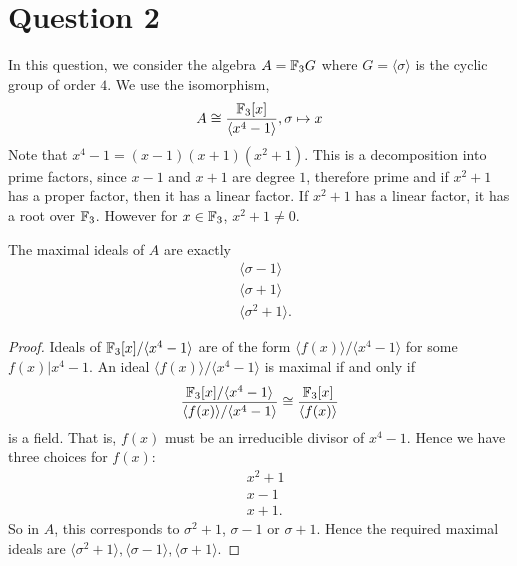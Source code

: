 \documentclass{unswmaths}
\begin{document}
\section*{Question 2}
In this question, we consider the algebra $A = {\mathbb{F}_3} G$ where $G = \langle \sigma\rangle$
is the cyclic group of order $4$. We use the isomorphism,
\begin{equation*}
    A\cong \frac{{\mathbb{F}_3}[x]}{\langle x^4-1\rangle}, \sigma\mapsto x
\end{equation*}
Note that $x^4-1 = (x-1)(x+1)(x^2+1)$. This is a decomposition into prime factors,
since $x-1$ and $x+1$ are degree $1$, therefore prime and if $x^2+1$ has a proper factor,
then it has a linear factor. If $x^2+1$ has a linear factor, it has a root over ${\mathbb{F}_3}$. However
for $x \in {\mathbb{F}_3}$, $x^2+1\neq 0$.

\begin{lemma}
    The maximal ideals of $A$ are exactly
    \begin{align*}
        &\langle \sigma-1\rangle\\
        &\langle \sigma+1\rangle\\
        &\langle \sigma^2+1\rangle.
    \end{align*}
\end{lemma}
\begin{proof}
    Ideals of ${\mathbb{F}_3}[x]/\langle x^4-1\rangle$ are of the form $\langle f(x)\rangle/\langle x^4-1\rangle$
    for some $f(x)|x^4-1$. An ideal $\langle f(x) \rangle/\langle x^4-1\rangle$ is maximal
    if and only if
    \begin{equation*}
        \frac{{\mathbb{F}_3}[x]/\langle x^4-1\rangle}{\langle f(x)\rangle/\langle x^4-1\rangle} \cong \frac{{\mathbb{F}_3}[x]}{\langle f(x)\rangle}
    \end{equation*}
    is a field. That is, $f(x)$ must be an irreducible divisor of $x^4-1$. Hence we
    have three choices for $f(x)$:
    \begin{align*}
        &x^2+1\\
        &x-1\\
        &x+1.
    \end{align*}
    So in $A$, this corresponds to $\sigma^2+1$, $\sigma-1$ or $\sigma+1$. Hence the required
    maximal ideals are $\langle \sigma^2+1\rangle,\langle\sigma-1\rangle,\langle \sigma+1\rangle$. 
\end{proof}
\end{document}
